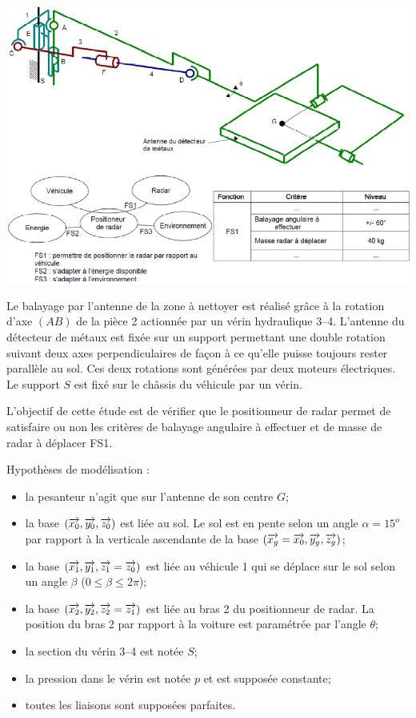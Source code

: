 \documentclass[10pt]{article}
\begin{document}
{\begin{center}
\includegraphics[width=.9\textwidth]{images/img2}
\end{center}

Le balayage par l'antenne de la zone à nettoyer est réalisé grâce à la rotation d'axe $(AB)$ de la pièce 2 actionnée par un vérin hydraulique 3--4. L'antenne du détecteur de métaux est fixée sur un support permettant une double rotation suivant deux axes perpendiculaires de façon à ce qu'elle puisse toujours rester parallèle au sol. Ces deux rotations sont générées par deux moteurs électriques. Le support $S$ est fixé sur le châssis du véhicule par un vérin.

L'objectif de cette étude est de vérifier que le positionneur de radar permet de satisfaire ou non les critères de balayage angulaire à effectuer et de masse de radar à déplacer FS1. 

Hypothèses de modélisation : 
\begin{itemize}
\item la pesanteur n'agit que sur l'antenne de son centre $G$; 
\item la base $(\overrightarrow{x_0}, \overrightarrow{y_0}, \overrightarrow{z_0})$ est liée au sol. Le sol est en pente selon un angle $\alpha=15^o$ par rapport à la verticale ascendante de la base $(\overrightarrow{x_g}= \overrightarrow{x_0}, \overrightarrow{y_g},\overrightarrow{z_g})$;
\item la base $(\overrightarrow{x_1}, \overrightarrow{y_1}, \overrightarrow{z_1}=\overrightarrow{z_0})$ est liée au véhicule 1 qui se déplace sur le sol selon un angle $\beta$ ($0\leq \beta \leq 2\pi$);
\item la base $(\overrightarrow{x_2}, \overrightarrow{y_2}, \overrightarrow{z_2}=\overrightarrow{z_1})$  est liée au bras 2 du positionneur de radar. La position du bras 2 par rapport à la voiture est paramétrée par l'angle $\theta$;
\item la section du vérin 3--4 est notée $S$; 
\item la pression dans le vérin est notée $p$ et est supposée constante;
\item toutes les liaisons sont supposées parfaites.
\end{itemize}


}
\end{document}
